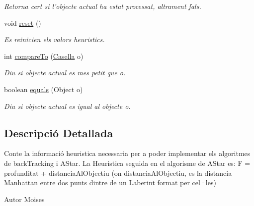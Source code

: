 \begin{DoxyCompactItemize}
\begin{DoxyCompactList}\small\item\em Retorna cert si l'objecte actual ha estat processat, altrament fals. \end{DoxyCompactList}\item 
void \hyperlink{classlogica_1_1algoritmica_1_1_casella_a8ed287353991f4b700bc45145dc00ab7}{reset} ()
\begin{DoxyCompactList}\small\item\em Es reinicien els valors heuristics. \end{DoxyCompactList}\item 
int \hyperlink{classlogica_1_1algoritmica_1_1_casella_aae2b9f535fd0da3a750f6a6048db1944}{compare\+To} (\hyperlink{classlogica_1_1algoritmica_1_1_casella}{Casella} o)
\begin{DoxyCompactList}\small\item\em Diu si objecte actual es mes petit que o. \end{DoxyCompactList}\item 
boolean \hyperlink{classlogica_1_1algoritmica_1_1_casella_ab47747886e465a9fdda726b0cdb987da}{equals} (Object o)
\begin{DoxyCompactList}\small\item\em Diu si objecte actual es igual al objecte o. \end{DoxyCompactList}\end{DoxyCompactItemize}


\subsection{Descripció Detallada}
Conte la informació heuristica necessaria per a poder implementar els algoritmes de back\+Tracking i A\+Star. La Heuristica seguida en el algorisme de A\+Star es\+: F = profunditat + distancia\+Al\+Objectiu (on distancia\+Al\+Objectiu, es la distancia Manhattan entre dos punts dintre de un Laberint format per cel·les) 

\begin{DoxyAuthor}{Autor}
Moises 
\end{DoxyAuthor}


